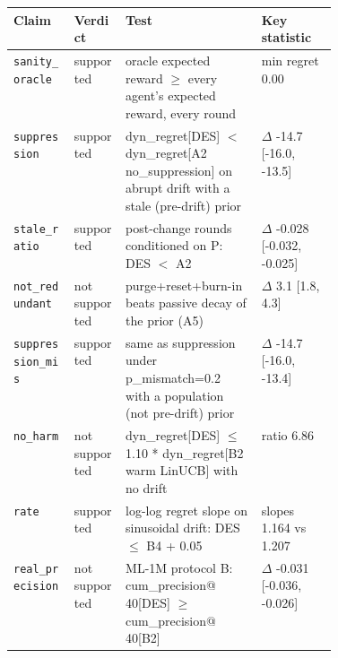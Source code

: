 \begin{tabular}{llp{0.42\linewidth}l}
\toprule
Claim & Verdict & Test & Key statistic \\
\midrule
\texttt{sanity\_oracle} & supported & oracle expected reward $\ge$ every agent's expected reward, every round & min regret 0.00 \\
\texttt{suppression} & supported & dyn\_regret[DES] $<$ dyn\_regret[A2 no\_suppression] on abrupt drift with a stale (pre-drift) prior & $\Delta$ -14.7 [-16.0, -13.5] \\
\texttt{stale\_ratio} & supported & post-change rounds conditioned on P: DES $<$ A2 & $\Delta$ -0.028 [-0.032, -0.025] \\
\texttt{not\_redundant} & not supported & purge+reset+burn-in beats passive decay of the prior (A5) & $\Delta$ 3.1 [1.8, 4.3] \\
\texttt{suppression\_mis} & supported & same as suppression under p\_mismatch=0.2 with a population (not pre-drift) prior & $\Delta$ -14.7 [-16.0, -13.4] \\
\texttt{no\_harm} & not supported & dyn\_regret[DES] $\le$ 1.10 * dyn\_regret[B2 warm LinUCB] with no drift & ratio 6.86 \\
\texttt{rate} & supported & log-log regret slope on sinusoidal drift: DES $\le$ B4 + 0.05 & slopes 1.164 vs 1.207 \\
\texttt{real\_precision} & not supported & ML-1M protocol B: cum\_precision@\,40[DES] $\ge$ cum\_precision@\,40[B2] & $\Delta$ -0.031 [-0.036, -0.026] \\
\bottomrule
\end{tabular}